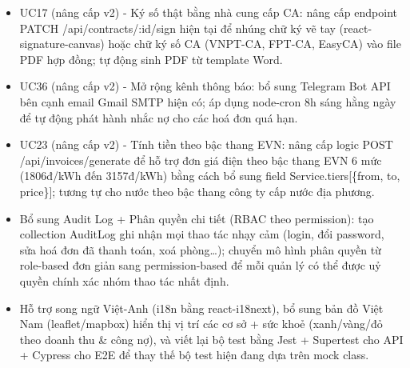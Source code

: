 \begin{itemize}
  chuyển sang merchant VNPay production, bổ sung ví MoMo, biên lai PDF
  tự động và đối soát giao dịch định kỳ.
\item
  UC17 (nâng cấp v2) - Ký số thật bằng nhà cung cấp CA: nâng cấp
  endpoint PATCH /api/contracts/:id/sign hiện tại để nhúng chữ ký vẽ tay
  (react-signature-canvas) hoặc chữ ký số CA (VNPT-CA, FPT-CA, EasyCA)
  vào file PDF hợp đồng; tự động sinh PDF từ template Word.
\item
  UC36 (nâng cấp v2) - Mở rộng kênh thông báo: bổ sung Telegram Bot API
  bên cạnh email Gmail SMTP hiện có; áp dụng node-cron 8h sáng hằng ngày
  để tự động phát hành nhắc nợ cho các hoá đơn quá hạn.
\item
  UC23 (nâng cấp v2) - Tính tiền theo bậc thang EVN: nâng cấp logic POST
  /api/invoices/generate để hỗ trợ đơn giá điện theo bậc thang EVN 6 mức
  (1806đ/kWh đến 3157đ/kWh) bằng cách bổ sung field
  Service.tiers{[}\{from, to, price\}{]}; tương tự cho nước theo bậc
  thang công ty cấp nước địa phương.
\item
  Bổ sung Audit Log + Phân quyền chi tiết (RBAC theo permission): tạo
  collection AuditLog ghi nhận mọi thao tác nhạy cảm (login, đổi
  password, sửa hoá đơn đã thanh toán, xoá phòng\ldots); chuyển mô hình
  phân quyền từ role-based đơn giản sang permission-based để mỗi quản lý
  có thể được uỷ quyền chính xác nhóm thao tác nhất định.
\item
  Hỗ trợ song ngữ Việt-Anh (i18n bằng react-i18next), bổ sung bản đồ
  Việt Nam (leaflet/mapbox) hiển thị vị trí các cơ sở + sức khoẻ
  (xanh/vàng/đỏ theo doanh thu \& công nợ), và viết lại bộ test bằng
  Jest + Supertest cho API + Cypress cho E2E để thay thế bộ test hiện
  đang dựa trên mock class.
\end{itemize}

